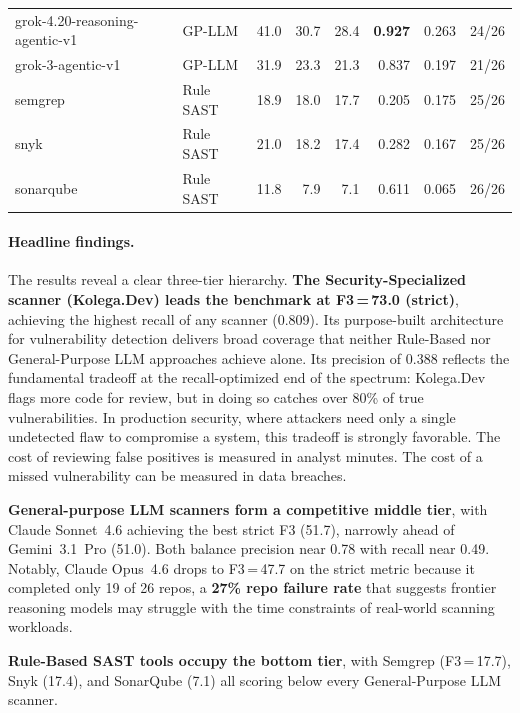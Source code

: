 \begin{table}[t]
\begin{tabular}{@{}llrrrrrc@{}}
grok-4.20-reasoning-agentic-v1      & GP-LLM    & 41.0 & 30.7 & 28.4          & \textbf{0.927} & 0.263 & 24/26 \\
grok-3-agentic-v1                   & GP-LLM    & 31.9 & 23.3 & 21.3          & 0.837 & 0.197          & 21/26 \\
\midrule
semgrep                             & Rule SAST   & 18.9 & 18.0 & 17.7          & 0.205 & 0.175          & 25/26 \\
snyk                                & Rule SAST   & 21.0 & 18.2 & 17.4          & 0.282 & 0.167          & 25/26 \\
sonarqube                           & Rule SAST   & 11.8 &  7.9 & 7.1           & 0.611 & 0.065          & 26/26 \\
\bottomrule
\end{tabular}
\end{table}

\paragraph{Headline findings.}
The results reveal a clear three-tier hierarchy.
\textbf{The Security-Specialized scanner (Kolega.Dev) leads the benchmark at F3\,=\,73.0 (strict)}, achieving the highest recall of any scanner (0.809). Its purpose-built architecture for vulnerability detection delivers broad coverage that neither Rule-Based nor General-Purpose LLM approaches achieve alone.
Its precision of 0.388 reflects the fundamental tradeoff at the recall-optimized end of the spectrum: Kolega.Dev flags more code for review, but in doing so catches over 80\% of true vulnerabilities. In production security, where attackers need only a single undetected flaw to compromise a system, this tradeoff is strongly favorable. The cost of reviewing false positives is measured in analyst minutes. The cost of a missed vulnerability can be measured in data breaches.

\textbf{General-purpose LLM scanners form a competitive middle tier}, with Claude Sonnet~4.6 achieving the best strict F3 (51.7), narrowly ahead of Gemini~3.1~Pro (51.0).
Both balance precision near 0.78 with recall near 0.49.
Notably, Claude Opus~4.6 drops to F3\,=\,47.7 on the strict metric because it completed only 19 of 26 repos, a \textbf{27\% repo failure rate} that suggests frontier reasoning models may struggle with the time constraints of real-world scanning workloads.

\textbf{Rule-Based SAST tools occupy the bottom tier}, with Semgrep (F3\,=\,17.7), Snyk (17.4), and SonarQube (7.1) all scoring below every General-Purpose LLM scanner.

